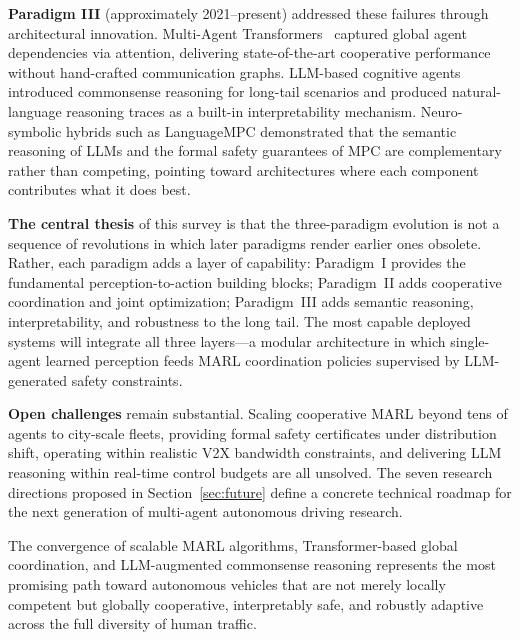 \documentclass[12pt, a4paper]{article}
\begin{document}
\textbf{Paradigm III} (approximately 2021--present) addressed these failures
through architectural innovation.  Multi-Agent Transformers~\cite{wen2022multi}
captured global agent dependencies via attention, delivering state-of-the-art
cooperative performance without hand-crafted communication graphs.
LLM-based cognitive agents~\cite{fu2023drive,wen2023dilu,sha2023languagempc}
introduced commonsense reasoning for long-tail scenarios and produced
natural-language reasoning traces as a built-in interpretability mechanism.
Neuro-symbolic hybrids such as LanguageMPC demonstrated that the semantic
reasoning of LLMs and the formal safety guarantees of MPC are complementary
rather than competing, pointing toward architectures where each component
contributes what it does best.

\textbf{The central thesis} of this survey is that the three-paradigm
evolution is not a sequence of revolutions in which later paradigms render
earlier ones obsolete.  Rather, each paradigm adds a layer of capability:
Paradigm~I provides the fundamental perception-to-action building blocks;
Paradigm~II adds cooperative coordination and joint optimization; Paradigm~III
adds semantic reasoning, interpretability, and robustness to the long tail.
The most capable deployed systems will integrate all three layers---a
modular architecture in which single-agent learned perception feeds MARL
coordination policies supervised by LLM-generated safety constraints.

\textbf{Open challenges} remain substantial.  Scaling cooperative MARL
beyond tens of agents to city-scale fleets, providing formal safety
certificates under distribution shift, operating within realistic V2X
bandwidth constraints, and delivering LLM reasoning within real-time
control budgets are all unsolved.  The seven research directions proposed
in Section~\ref{sec:future} define a concrete technical roadmap for the
next generation of multi-agent autonomous driving research.

The convergence of scalable MARL algorithms, Transformer-based global
coordination, and LLM-augmented commonsense reasoning represents the most
promising path toward autonomous vehicles that are not merely locally
competent but globally cooperative, interpretably safe, and robustly
adaptive across the full diversity of human traffic.



\end{document}
